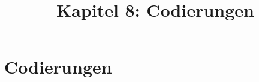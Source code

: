 \documentclass[18pt]{beamer}
\title[Codierungen]{Kapitel 8: Codierungen}
\begin{document}


\begin{frame}
 \titlepage
\end{frame}

\def\showSolutions{1}					 %

\section{Codierungen}
\title[Codierungen]{}

\end{document}
